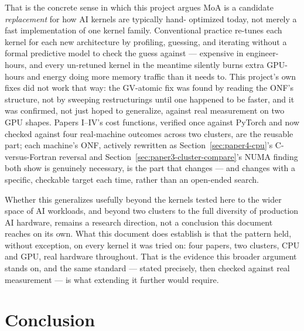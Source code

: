 \documentclass[11pt]{article}
\begin{document}
That is the concrete sense in which this project argues MoA is a
candidate \emph{replacement} for how AI kernels are typically hand-
optimized today, not merely a fast implementation of one kernel family.
Conventional practice re-tunes each kernel for each new architecture by
profiling, guessing, and iterating without a formal predictive model to
check the guess against --- expensive in engineer-hours, and every
un-retuned kernel in the meantime silently burns extra GPU-hours and
energy doing more memory traffic than it needs to. This project's own
fixes did not work that way: the GV-atomic fix was found by reading the
ONF's structure, not by sweeping restructurings until one happened to
be faster, and it was confirmed, not just hoped to generalize, against
real measurement on two GPU shapes. Papers I--IV's cost functions,
verified once against PyTorch and now checked against four real-machine
outcomes across two clusters, are the reusable part; each machine's
ONF, actively rewritten as Section~\ref{sec:paper4-cpu}'s C-versus-Fortran
reversal and Section~\ref{sec:paper3-cluster-compare}'s NUMA finding
both show is genuinely necessary, is the part that changes --- and
changes with a specific, checkable target each time, rather than an
open-ended search.

Whether this generalizes usefully beyond the kernels tested here to the
wider space of AI workloads, and beyond two clusters to the full
diversity of production AI hardware, remains a research direction, not
a conclusion this document reaches on its own. What this document does
establish is that the pattern held, without exception, on every kernel
it was tried on: four papers, two clusters, CPU and GPU, real hardware
throughout. That is the evidence this broader argument stands on, and
the same standard --- stated precisely, then checked against real
measurement --- is what extending it further would require.

\section{Conclusion}
\end{document}
